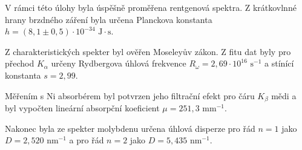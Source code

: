 V rámci této úlohy byla úspěšně proměřena rentgenová spektra. Z krátkovlnné hrany brzdného záření byla určena Planckova konstanta $h = (8,1 \pm 0,5) \cdot 10^{-34} \text{ J}\cdot\text{s}$.

Z charakteristických spekter byl ověřen Moseleyův zákon. Z fitu dat byly pro přechod $K_{\alpha}$ určeny Rydbergova úhlová frekvence $R_{\omega} = 2,69 \cdot 10^{16} \text{ s}^{-1}$ a stínící konstanta $s = 2,99$.

Měřením s Ni absorbérem byl potvrzen jeho filtrační efekt pro čáru $K_{\beta}$ mědi a byl vypočten lineární absorpční koeficient $\mu = 251,3 \text{ mm}^{-1}$.

Nakonec byla ze spekter molybdenu určena úhlová disperze pro řád $n=1$ jako $D = 2,520 \text{ nm}^{-1}$ a pro řád $n=2$ jako $D = 5,435 \text{ nm}^{-1}$.